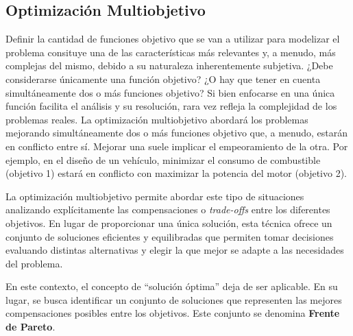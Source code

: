 \documentclass[12pt,a4paper]{book}
\begin{document}
\subsection{Optimización Multiobjetivo}

Definir la cantidad de funciones objetivo que se van a utilizar para modelizar el problema consituye una de las características más relevantes y, a menudo, más complejas del mismo, debido a su naturaleza inherentemente subjetiva.
¿Debe considerarse únicamente una función objetivo? ¿O hay que tener en cuenta simultáneamente 
dos o más funciones objetivo? Si bien enfocarse en una única función facilita el análisis y su resolución, rara vez refleja la complejidad de los problemas reales. La optimización multiobjetivo
abordará los problemas mejorando simultáneamente dos o más funciones objetivo que, a menudo, estarán en conflicto entre sí. Mejorar una suele implicar el empeoramiento de la otra.
Por ejemplo, en el diseño de un vehículo, minimizar el consumo de combustible (objetivo 1) estará en conflicto con maximizar la potencia del motor (objetivo 2).

La optimización multiobjetivo permite abordar este tipo de situaciones analizando
explícitamente las compensaciones o \textit{trade-offs} entre los diferentes objetivos. En lugar de proporcionar una única solución, esta técnica ofrece un conjunto de soluciones eficientes y equilibradas que permiten
tomar decisiones evaluando distintas alternativas y elegir la que mejor se adapte a las necesidades del problema.

En este contexto, el concepto de “solución óptima” deja de ser aplicable. En su lugar, se busca identificar un conjunto de soluciones que representen las mejores compensaciones posibles entre los objetivos. Este conjunto se denomina \textbf{Frente de Pareto}.
\end{document}

